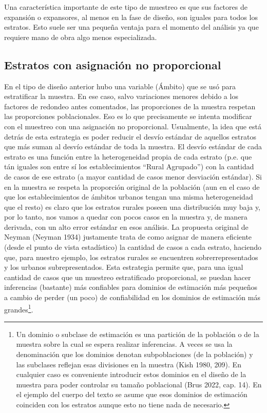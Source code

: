 \documentclass[
  spanish,
  a4paper,
]{scrreprt}
\begin{document}
Una característica importante de este tipo de muestreo es que sus
factores de expansión o expansores, al menos en la fase de diseño, son
iguales para todos los estratos. Esto suele ser una pequeña ventaja para
el momento del análisis ya que requiere mano de obra algo menos
especializada.

\subsection{Estratos con asignación no
proporcional}\label{sec-estrato_no_proporcional}

En el tipo de diseño anterior hubo una variable (Ámbito) que se usó para
estratificar la muestra. En ese caso, salvo variaciones menores debido a
los factores de redondeo antes comentados, las proporciones de la
muestra respetan las proporciones poblacionales. Eso es lo que
precisamente se intenta modificar con el muestreo con una asignación no
proporcional. Usualmente, la idea que está detrás de esta estrategia es
poder reducir el desvío estándar de aquellos estratos que más suman al
desvío estándar de toda la muestra. El desvío estándar de cada estrato
es una función entre la heterogeneidad propia de cada estrato (p.e. que
tán iguales son entre sí los establecimientos ``Rural Agrupado'') con la
cantidad de casos de ese estrato (a mayor cantidad de casos menor
desviación estándar). Si en la muestra se respeta la proporción original
de la población (aun en el caso de que los establecimientos de ámbitos
urbanos tengan una misma heterogeneidad que el resto) es claro que los
estratos rurales poseen una distribución muy baja y, por lo tanto, nos
vamos a quedar con pocos casos en la muestra y, de manera derivada, con
un alto error estándar en esos análisis. La propuesta original de Neyman
(Neyman 1934) justamente trata de como asignar de manera eficiente
(desde el punto de vista estadístico) la cantidad de casos a cada
estrato, haciendo que, para nuestro ejemplo, los estratos rurales se
encuentren sobrerrepresentados y los urbanos subrepresentados. Esta
estrategia permite que, para una igual cantidad de casos que un muestreo
estratificado proporcional, se puedan hacer inferencias (bastante) más
confiables para dominios de estimación más pequeños a cambio de perder
(un poco) de confiabilidad en los dominios de estimación más
grandes\footnote{Un dominio o subclase de estimación es una partición de
  la población o de la muestra sobre la cual se espera realizar
  inferencias. A veces se usa la denominación que los dominios denotan
  subpoblaciones (de la población) y las subclases reflejan esas
  divisiones en la muestra (Kish 1980, 209). En cualquier caso es
  conveniente introducir estos dominios en el diseño de la muestra para
  poder controlar su tamaño poblacional (Brus 2022, cap. 14). En el
  ejemplo del cuerpo del texto se asume que esos dominios de estimación
  coinciden con los estratos aunque esto no tiene nada de necesario.}.
\end{document}
